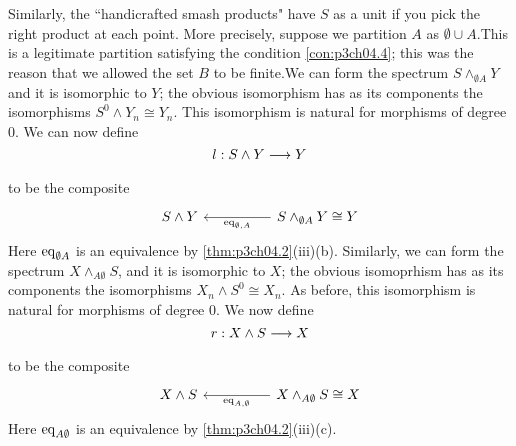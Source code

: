 \documentclass[../main]{subfiles}
\begin{document}
Similarly, the “handicrafted smash products" have $S$ as a unit if
you pick the right product at each point. More precisely, suppose we
partition $A$ as $\emptyset\cup A$.This is a legitimate partition satisfying the
condition \ref{con:p3ch04.4}; this was the reason that we allowed the set $B$ to be finite.We can form the spectrum $S\wedge_{\emptyset A}Y$ and it is isomorphic to $Y$; the obvious isomorphism has as its components the isomorphisms $S^0\wedge Y_n \cong Y_n$. This isomorphism is natural for morphisms of degree $0$. We can now define \[ l:S\wedge Y\lar{}Y\]
to be the composite \[\begin{tikzcd}
S\wedge Y &&S\wedge_{\emptyset A}Y\cong Y\arrow[ll,"\te{eq}_{\emptyset,A}"]
\end{tikzcd}\]
Here $\mathrm{eq}_{\emptyset A}$ is an equivalence by \ref{thm:p3ch04.2}(iii)(b). Similarly, we can form the spectrum $X\wedge_{A\emptyset} S$, and it is isomorphic to $X$; the obvious isomoprhism has as its components the isomorphisms $X_n\wedge S^0 \cong X_n$. As before, this isomorphism is natural for morphisms of degree $0$. We now define \[ r:X\wedge S\lar{}X\]
to be the composite \[\begin{tikzcd}
X\wedge S &&X\wedge_{A\emptyset }S\cong X\arrow[ll,"\te{eq}_{A,\emptyset}"]
\end{tikzcd} \]
Here $\mathrm{eq}_{A\emptyset}$ is an equivalence by \ref{thm:p3ch04.2}(iii)(c).
\end{document}
